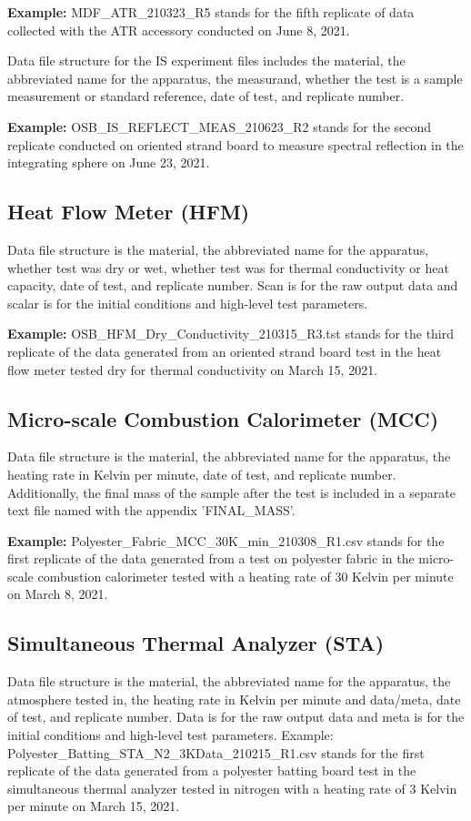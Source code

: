 \documentclass[12pt,oneside]{book}
\begin{document}
{\bf Example:} MDF\_ATR\_210323\_R5 stands for the fifth replicate of data collected with the ATR accessory conducted on June 8, 2021.

Data file structure for the IS experiment files includes the material, the abbreviated name for the apparatus, the measurand, whether the test is a sample measurement or standard reference, date of test, and replicate number.

{\bf Example:} OSB\_IS\_REFLECT\_MEAS\_210623\_R2 stands for the second replicate conducted on oriented strand board to measure spectral reflection in the integrating sphere on June 23, 2021.

\subsection{Heat Flow Meter (HFM)}
Data file structure is the material, the abbreviated name for the apparatus, whether test was dry or wet, whether test was for thermal conductivity or heat capacity, date of test, and replicate number. Scan is for the raw output data and scalar is for the initial conditions and high-level test parameters.

{\bf Example:} OSB\_HFM\_Dry\_Conductivity\_210315\_R3.tst stands for the third replicate of the data generated from an oriented strand board test in the heat flow meter tested dry for thermal conductivity on March 15, 2021.

\subsection{Micro-scale Combustion Calorimeter (MCC)}
Data file structure is the material, the abbreviated name for the apparatus, the heating rate in Kelvin per minute, date of test, and replicate number. Additionally, the final mass of the sample after the test is included in a separate text file named with the appendix 'FINAL\_MASS'.

{\bf Example:} Polyester\_Fabric\_MCC\_30K\_min\_210308\_R1.csv stands for the first replicate of the data generated from a test on polyester fabric in the micro-scale combustion calorimeter tested with a heating rate of 30 Kelvin per minute on March 8, 2021.

\subsection{Simultaneous Thermal Analyzer (STA)}
Data file structure is the material, the abbreviated name for the apparatus, the atmosphere tested in, the heating rate in Kelvin per minute and data/meta, date of test, and replicate number. Data is for the raw output data and meta is for the initial conditions and high-level test parameters.
Example: Polyester\_Batting\_STA\_N2\_3KData\_210215\_R1.csv stands for the first replicate of the data generated from a polyester batting board test in the simultaneous thermal analyzer tested in nitrogen with a heating rate of 3 Kelvin per minute on March 15, 2021.
\end{document}
